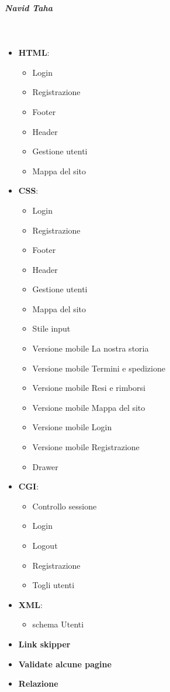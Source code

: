 	\subparagraph{Navid Taha}~
	
	\begin{itemize}
		\item \textbf{HTML}:
			\begin{itemize}
				\item Login
				\item Registrazione
				\item Footer
				\item Header
				\item Gestione utenti
				\item Mappa del sito
			\end{itemize}
		
		\item \textbf{CSS}:
			\begin{itemize}
				\item Login
				\item Registrazione
				\item Footer
				\item Header
				\item Gestione utenti
				\item Mappa del sito
				\item Stile input
				\item Versione mobile La nostra storia
				\item Versione mobile Termini e spedizione
				\item Versione mobile Resi e rimborsi
				\item Versione mobile Mappa del sito
				\item Versione mobile Login
				\item Versione mobile Registrazione
				\item Drawer
			\end{itemize}
		\item \textbf{CGI}:
			\begin{itemize}
				\item Controllo sessione
				\item Login
				\item Logout
				\item Registrazione
				\item Togli utenti
			\end{itemize}
		
		\item \textbf{XML}:
			\begin{itemize}
			 	\item schema Utenti
			\end{itemize}
		
		\item \textbf{Link skipper}
		\item \textbf{Validate alcune pagine}
		\item \textbf{Relazione}
	\end{itemize}	
	
